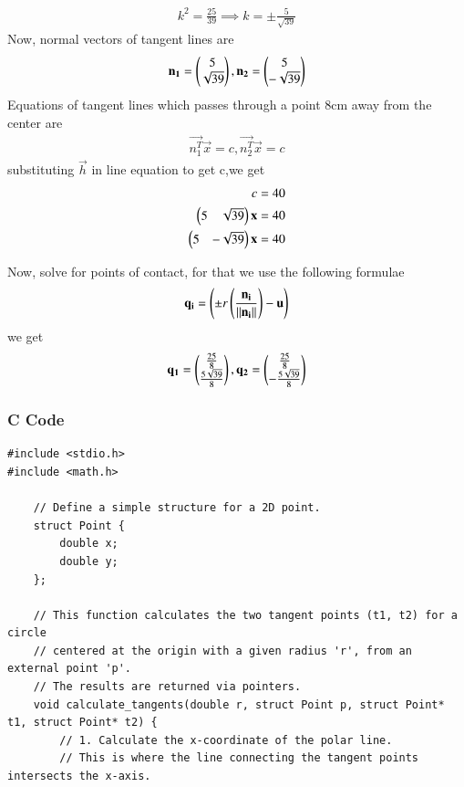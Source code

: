 \documentclass{beamer}
\begin{document}
\begin{frame}
\begin{align}
    k^2=\frac{25}{39}\implies k=\pm\frac{5}{\sqrt{39}}
\end{align}
Now, normal vectors of tangent lines are
\begin{align}
    \mathbf{n_1}=\begin{pmatrix}5\\ \sqrt{39}\end{pmatrix},\mathbf{n_2}=\begin{pmatrix}5\\ -\sqrt{39}\end{pmatrix}
\end{align}
Equations of tangent lines which passes through a point 8cm away from the center are
\begin{align}
    \vec{n_1^T}\vec{x}=c,\vec{n_2^T}\vec{x}=c
\end{align}
substituting $\vec{h}$ in line equation to get c,we get
\begin{align}
    c=40\\
    \begin{pmatrix}5&\sqrt{39}\end{pmatrix}\mathbf{x}=40\\
    \begin{pmatrix}5&-\sqrt{39}\end{pmatrix}\mathbf{x}=40
\end{align}
\end{frame}
\begin{frame}
Now, solve for points of contact, for that we use the following formulae
\begin{align}
    \mathbf{q_i}=\left(\pm r\left(\frac{\mathbf{n_i}}{\left\lVert\mathbf{n_i}\right\rVert}\right)-\mathbf{u}\right)
\end{align}
we get
\begin{align}
    \mathbf{q_1}=\begin{pmatrix}\frac{25}{8}\\\frac{5\sqrt{39}}{8}\end{pmatrix},
    \mathbf{q_2}=\begin{pmatrix}\frac{25}{8}\\-\frac{5\sqrt{39}}{8}\end{pmatrix}
\end{align}
\end{frame}
\begin{frame}[fragile]
\frametitle{C Code}
\begin{lstlisting}
#include <stdio.h>
#include <math.h>

    // Define a simple structure for a 2D point.
    struct Point {
        double x;
        double y;
    };

    // This function calculates the two tangent points (t1, t2) for a circle
    // centered at the origin with a given radius 'r', from an external point 'p'.
    // The results are returned via pointers.
    void calculate_tangents(double r, struct Point p, struct Point* t1, struct Point* t2) {
        // 1. Calculate the x-coordinate of the polar line.
        // This is where the line connecting the tangent points intersects the x-axis.
\end{lstlisting}
\end{frame}
\end{document}
